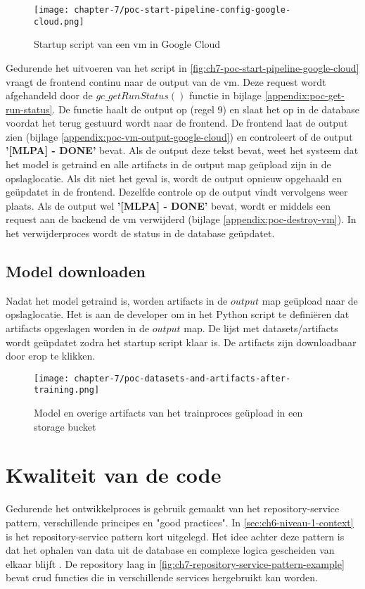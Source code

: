 \begin{figure}[hbt!]
  \centering
  \texttt{[image: chapter-7/poc-start-pipeline-config-google-cloud.png]}
  \caption{Startup script van een \acrfull{vm} in Google Cloud}
  \label{fig:ch7-poc-start-pipeline-config-google-cloud}
\end{figure}

Gedurende het uitvoeren van het script in \autoref{fig:ch7-poc-start-pipeline-google-cloud} vraagt de frontend continu naar de output van de \acrshort{vm}. Deze request wordt afgehandeld door de \(gc\_getRunStatus()\) functie in bijlage \ref{appendix:poc-get-run-status}. De functie haalt de output op (regel 9) en slaat het op in de database voordat het terug gestuurd wordt naar de frontend. De frontend laat de output zien (bijlage \ref{appendix:poc-vm-output-google-cloud}) en controleert of de output \textbf{'[MLPA] - DONE'} bevat. Als de output deze tekst bevat, weet het systeem dat het model is getraind en alle \glspl{artifact} in de output map geüpload zijn in de opslaglocatie. Als dit niet het geval is, wordt de output opnieuw opgehaald en geüpdatet in de frontend. Dezelfde controle op de output vindt vervolgens weer plaats. Als de output wel \textbf{'[MLPA] - DONE'} bevat, wordt er middels een request aan de backend de \acrshort{vm} verwijderd (bijlage \ref{appendix:poc-destroy-vm}). In het verwijderproces wordt de status in de database geüpdatet.

\subsection{Model downloaden}\label{subsec:ch7-model-downloaden}
Nadat het model getraind is, worden \glspl{artifact} in de \(output\) map geüpload naar de opslaglocatie. Het is aan de developer om in het Python script te definiëren dat artifacts opgeslagen worden in de \(output\) map. De lijst met datasets/\glspl{artifact} wordt geüpdatet zodra het startup script klaar is. De \glspl{artifact} zijn downloadbaar door erop te klikken.

\begin{figure}[hbt!]
  \centering
  \texttt{[image: chapter-7/poc-datasets-and-artifacts-after-training.png]}
  \caption{Model en overige \glspl{artifact} van het trainproces geüpload in een storage bucket}
  \label{fig:ch7-poc-datasets-and-artifacts-after-training}
\end{figure}

\section{Kwaliteit van de code}\label{sec:ch7-kwaliteit-van-de-code}
Gedurende het ontwikkelproces is gebruik gemaakt van het repository-service pattern, verschillende principes en "good practices". In \autoref{sec:ch6-niveau-1-context} is het repository-service pattern kort uitgelegd. Het idee achter deze pattern is dat het ophalen van data uit de database en complexe logica gescheiden van elkaar blijft \cite{repository-service-pattern}. De repository laag in \autoref{fig:ch7-repository-service-pattern-example} bevat \acrfull{crud} functies die in verschillende services hergebruikt kan worden. 

